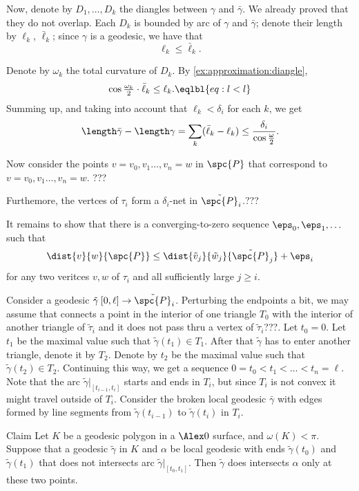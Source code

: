 Now, denote by $D_1,\dots, D_k$ the diangles between $\gamma$ and $\bar\gamma$.
We already proved that they do not overlap.
Each $D_k$ is bounded by arc of $\gamma$ and $\bar\gamma$;
denote their length by $\ell_k$, $\bar \ell_k$;
since $\gamma$ is a geodesic, we have that
\[\ell_k\le \bar\ell_k.\]

Denote by $\omega_k$ the total curvature of $D_k$.
By \ref{ex:approximation:diangle},
\[\cos\tfrac{\omega_k}2\cdot\bar\ell_k\le \ell_k.
\eqlbl{eq:l<l}\]
Summing up, and taking into account that $\ell_k<\delta_i$ for each $k$, we get
\[\length\bar\gamma-\length\gamma=\sum_k(\bar\ell_k-\ell_k)\le \frac{\delta_i}{\cos\tfrac{\omega}2}.\]

Now consider the points $v=v_0,v_1\dots,v_n=w$ in $\spc{P}$ that correspond to $v=v_0,v_1\dots,v_n=w$.
???
\qeds



Furthemore, the vertces of $\tau_i$ form a $\delta_i$-net in $\tilde{\spc{P}}_i$.???

It remains to show that there is a  converging-to-zero sequence $\eps_0,\eps_1,\dots$ such that
\[\dist{v}{w}{\spc{P}}\le \dist{\tilde v_j}{\tilde w_j}{\tilde{\spc{P}}_j}+\eps_i\]
for any two veritces $v,w$ of $\tau _i$ and all sufficiently large $j\ge i$.



Consider a geodesic $\tilde\gamma\:[0,\ell]\to\tilde{\spc{P}}_i$.
Perturbing the endpoints a bit, we may assume that connects a point in the interior of one triangle $T_0$ with the interior of another triangle of $\tilde\tau_i$ and it does not pass thru a vertex of $\tilde\tau_i$???.
Let $t_0=0$.
Let $t_1$ be the maximal value such that $\tilde\gamma(t_1) \in T_1$.
After that $\tilde\gamma$ has to enter another triangle, denote it by $T_2$.
Denote by $t_2$ be the maximal value such that $\tilde\gamma(t_2) \in T_2$.
Continuing this way, we get a sequence $0=t_0<t_1<\dots<t_n=\ell$.
Note that the arc $\tilde\gamma|_{[t_{i-1},t_i]}$ starts and ends in $T_i$, but since $T_i$ is not convex it might travel outside of $T_i$.
Consider the broken local geodesic $\bar\gamma$ with edges formed by line segments from $\tilde\gamma(t_{i-1})$ to $\tilde\gamma(t_i)$ in $T_i$.

\begin{thm}{Claim}
Let $K$ be a geodesic polygon in a $\Alex0$ surface, and $\omega(K)<\pi$.
Suppose that a geodesic $\tilde\gamma$ in $K$ and $\alpha$ be local geodesic with ends $\tilde\gamma(t_0)$ and $\tilde\gamma(t_1)$ that does not intersects arc $\tilde\gamma|_{[t_0,t_1]}$.
Then $\tilde\gamma$ does intersects $\alpha$ only at these two points.
\end{thm}




















